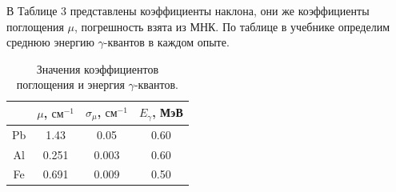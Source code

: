 \documentclass[a4paper,12pt]{article}
\begin{document}
В Таблице 3 представлены коэффициенты наклона, они же коэффициенты поглощения $\mu$, погрешность взята из МНК. По таблице в учебнике определим среднюю энергию $\gamma$-квантов в каждом опыте.
\begin{table}[h!]
\begin{tabular}{|c|c|c|c|}
\hline
   & $\mu$, $\text{см}^{-1}$ & $\sigma_\mu$, $\text{см}^{-1}$ & $E_\gamma$, МэВ \\ \hline
Pb & 1.43                    & 0.05                           & 0.60             \\ \hline
Al & 0.251                   & 0.003                          & 0.60             \\ \hline
Fe & 0.691                   & 0.009                          & 0.50             \\ \hline
\end{tabular}
\centering
\caption{Значения коэффициентов поглощения и энергия $\gamma$-квантов.}
\end{table}
\end{document}
